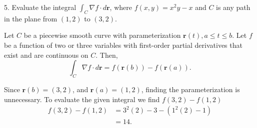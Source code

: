 \documentclass{report}
\begin{document}
    \bigbreak \noindent 
    \begin{mdframed}
        5. Evaluate the integral $\int_C \nabla f \cdot d\mathbf{r}$, where \(f(x, y) = x^2y - x\) and \(C\) is any path in the plane from \((1, 2)\) to \((3, 2)\).
    \end{mdframed}
    \bigbreak \noindent 
    \begin{remark}
        Let \( C \) be a piecewise smooth curve with parameterization \(\mathbf{r}(t), a \leq t \leq b\).
        \bigbreak \noindent 
        Let \( f \) be a function of two or three variables with first-order partial derivatives that exist and are continuous on \( C \). Then,
        \[
            \int_C \nabla f \cdot d\mathbf{r} = f(\mathbf{r}(b)) - f(\mathbf{r}(a)).
        \]
    \end{remark}
    \bigbreak \noindent 
    Since $\mathbf{r}(b) = (3,2)$, and $\mathbf{r}(a) = (1,2)$, finding the parameterization is unnecessary. To evaluate the given integral we find $f(3,2) - f(1,2) $
    \begin{align*}
        f(3,2) - f(1,2) &= 3^{2}(2)-3 - (1^{2}(2)-1) \\
        &=14
    .\end{align*}
\end{document}
